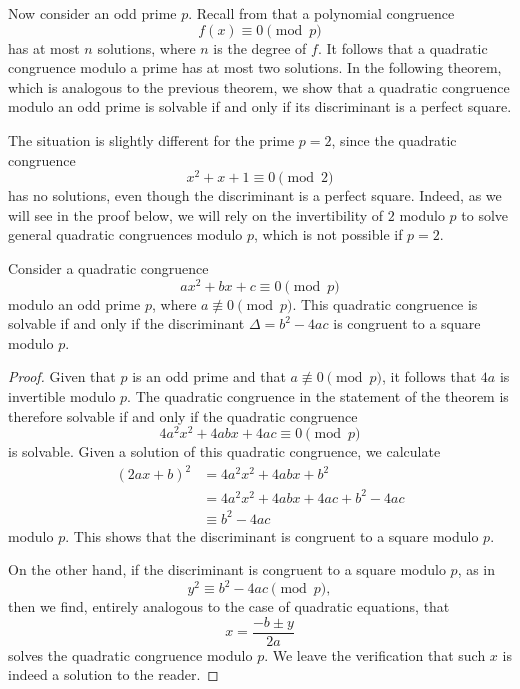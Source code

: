 Now consider an odd prime $p$. Recall from  that a polynomial congruence
\begin{equation*}
  f(x)\equiv 0\pmod{p}
\end{equation*}
has at most $n$ solutions, where $n$ is the degree of $f$. It follows that a quadratic congruence modulo a prime has at most two solutions. In the following theorem, which is analogous to the previous theorem, we show that a quadratic congruence modulo an odd prime is solvable if and only if its discriminant is a perfect square.

The situation is slightly different for the prime $p=2$, since the quadratic congruence
\begin{equation*}
  x^2+x+1\equiv 0\pmod{2}
\end{equation*}
has no solutions, even though the discriminant is a perfect square. Indeed, as we will see in the proof below, we will rely on the invertibility of $2$ modulo $p$ to solve general quadratic congruences modulo $p$, which is not possible if $p=2$.

\begin{theorem}\label{theorem:quadratic-congruence-mod-prime}
  Consider a quadratic congruence
  \begin{equation*}
    ax^2 + bx + c \equiv 0 \pmod{p}
  \end{equation*}
  modulo an odd prime $p$, where $a\nequiv 0\pmod{p}$. This quadratic congruence is solvable if and only if the discriminant $\Delta=b^2-4ac$ is congruent to a square modulo $p$.
\end{theorem}

\begin{proof}
  Given that $p$ is an odd prime and that $a\nequiv 0\pmod{p}$, it follows that $4a$ is invertible modulo $p$. The quadratic congruence in the statement of the theorem is therefore solvable if and only if the quadratic congruence
  \begin{equation*}
    4a^2x^2 + 4abx + 4ac \equiv 0 \pmod{p}
  \end{equation*}
  is solvable. Given a solution of this quadratic congruence, we calculate
  \begin{align*}
    (2ax + b)^2 & = 4a^2x^2 + 4abx + b^2 \\
                & = 4a^2x^2 + 4abx + 4ac + b^2 - 4ac \\
    & \equiv b^2 - 4ac
  \end{align*}
  modulo $p$. This shows that the discriminant is congruent to a square modulo $p$.

  On the other hand, if the discriminant is congruent to a square modulo $p$, as in
  \begin{equation*}
    y^2\equiv b^2-4ac\pmod{p},
  \end{equation*}
  then we find, entirely analogous to the case of quadratic equations, that
  \begin{equation*}
    x=\frac{-b\pm y}{2a}
  \end{equation*}
  solves the quadratic congruence modulo $p$. We leave the verification that such $x$ is indeed a solution to the reader.
\end{proof}

